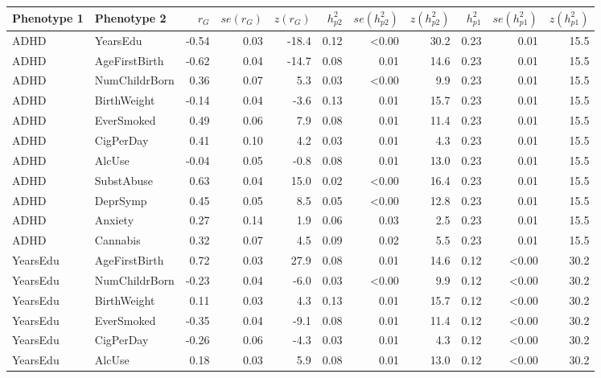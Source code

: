 {
\setlength\tabcolsep{3pt}
\renewcommand{\arraystretch}{0.6}
\begin{longtable}{llrrrrrrrrr}
  \hline
Phenotype 1 & Phenotype 2 & $r_G$ & $se(r_G)$ & $z(r_G)$ & $h^2_{p2}$ & $se(h^2_{p2})$ & $z(h^2_{p2})$ & $h^2_{p1}$ & $se(h^2_{p1})$ & $z(h^2_{p1})$ \\ 
  \hline
  \endhead
ADHD & YearsEdu & -0.54 & 0.03 & -18.4 & 0.12 & \textless 0.00 & 30.2 & 0.23 & 0.01 & 15.5 \\ 
ADHD & AgeFirstBirth & -0.62 & 0.04 & -14.7 & 0.08 & 0.01 & 14.6 & 0.23 & 0.01 & 15.5 \\ 
ADHD & NumChildrBorn & 0.36 & 0.07 & 5.3 & 0.03 & \textless 0.00 & 9.9 & 0.23 & 0.01 & 15.5 \\ 
ADHD & BirthWeight & -0.14 & 0.04 & -3.6 & 0.13 & 0.01 & 15.7 & 0.23 & 0.01 & 15.5 \\ 
ADHD & EverSmoked & 0.49 & 0.06 & 7.9 & 0.08 & 0.01 & 11.4 & 0.23 & 0.01 & 15.5 \\ 
ADHD & CigPerDay & 0.41 & 0.10 & 4.2 & 0.03 & 0.01 & 4.3 & 0.23 & 0.01 & 15.5 \\ 
ADHD & AlcUse & -0.04 & 0.05 & -0.8 & 0.08 & 0.01 & 13.0 & 0.23 & 0.01 & 15.5 \\ 
ADHD & SubstAbuse & 0.63 & 0.04 & 15.0 & 0.02 & \textless 0.00 & 16.4 & 0.23 & 0.01 & 15.5 \\ 
ADHD & DeprSymp & 0.45 & 0.05 & 8.5 & 0.05 & \textless 0.00 & 12.8 & 0.23 & 0.01 & 15.5 \\ 
ADHD & Anxiety & 0.27 & 0.14 & 1.9 & 0.06 & 0.03 & 2.5 & 0.23 & 0.01 & 15.5 \\ 
ADHD & Cannabis & 0.32 & 0.07 & 4.5 & 0.09 & 0.02 & 5.5 & 0.23 & 0.01 & 15.5 \\ 
YearsEdu & AgeFirstBirth & 0.72 & 0.03 & 27.9 & 0.08 & 0.01 & 14.6 & 0.12 & \textless 0.00 & 30.2 \\ 
YearsEdu & NumChildrBorn & -0.23 & 0.04 & -6.0 & 0.03 & \textless 0.00 & 9.9 & 0.12 & \textless 0.00 & 30.2 \\ 
YearsEdu & BirthWeight & 0.11 & 0.03 & 4.3 & 0.13 & 0.01 & 15.7 & 0.12 & \textless 0.00 & 30.2 \\ 
YearsEdu & EverSmoked & -0.35 & 0.04 & -9.1 & 0.08 & 0.01 & 11.4 & 0.12 & \textless 0.00 & 30.2 \\ 
YearsEdu & CigPerDay & -0.26 & 0.06 & -4.3 & 0.03 & 0.01 & 4.3 & 0.12 & \textless 0.00 & 30.2 \\ 
YearsEdu & AlcUse & 0.18 & 0.03 & 5.9 & 0.08 & 0.01 & 13.0 & 0.12 & \textless 0.00 & 30.2 \\ 

\end{longtable}}

